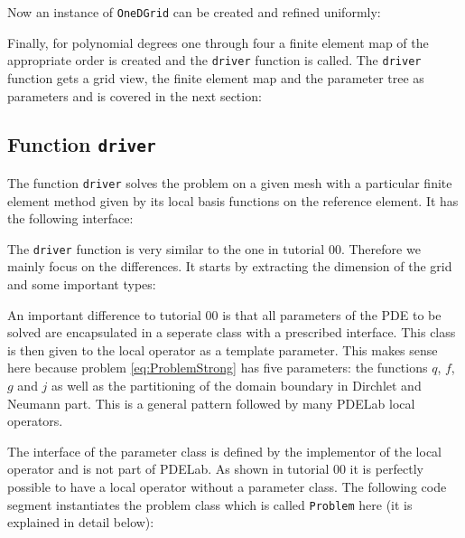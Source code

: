 \documentclass[a4paper,12pt]{article}
\begin{document}
Now an instance of \lstinline{OneDGrid} can be created and
refined uniformly:


Finally, for polynomial degrees one through four a finite element
map of the appropriate order is created and the \lstinline{driver} function
is called. The \lstinline{driver} function gets a grid view, the finite element map
and the parameter tree as parameters and is covered in the next section: 


\subsection{Function \lstinline{driver}}

The function \lstinline{driver} solves the problem on a given mesh 
with a particular finite element method given by its local basis functions
on the reference element. It has the following interface:


The \lstinline{driver} function is very similar to the one in
tutorial 00. Therefore we mainly focus on the differences.
It starts by extracting the dimension of the grid and some 
important types:


An important difference to tutorial 00 is that all parameters 
of the PDE to be solved are encapsulated in a seperate class with
a prescribed interface. This class is then given to the local operator
as a template parameter. This makes sense here because problem \eqref{eq:ProblemStrong}
has five parameters: the functions $q$, $f$, $g$ and $j$ as well as
the partitioning of the domain boundary in Dirchlet and Neumann
part. This is a general pattern followed by many PDELab local operators.

The interface of the parameter class is defined by the implementor of the
local operator and is not part of PDELab. As shown in tutorial 00 it is
perfectly possible to have a local operator without a parameter class.
The following code segment instantiates the problem class which 
is called \lstinline{Problem} here (it is explained in detail below):

\end{document}

